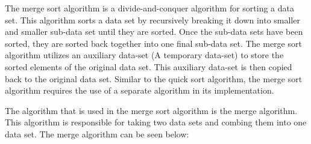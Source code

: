 The merge sort algorithm is a divide-and-conquer algorithm for sorting a data set. This algorithm sorts a data set by recursively breaking it down into smaller and smaller sub-data set until they are sorted. Once the sub-data sets have been sorted, they are sorted back together into one final sub-data set. The merge sort algorithm utilizes
an auxiliary data-set (A temporary data-set) to store the sorted elements of the original data set. This auxiliary data-set is then copied back to the original data set. Similar to the quick sort algorithm, the merge sort algorithm requires the use of a separate algorithm in its implementation.

The algorithm that is used in the merge sort algorithm is the merge algorithm. This algorithm is responsible for taking two data sets and combing them into one data set. The merge algorithm can be seen below:

